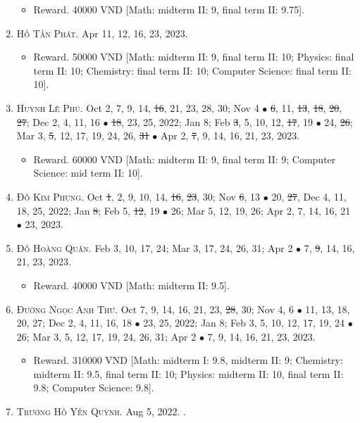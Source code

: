 \documentclass{article}
\begin{document}
\begin{enumerate}
	\begin{itemize}
		\item {\sf Reward.} 40000 VND [Math: midterm II: 9, final term II: 9.75].
	\end{itemize}
	\item \textsc{Hồ Tấn Phát.} {\sf[In]} Apr 11, 12, 16, 23, 2023.
	\begin{itemize}
		\item {\sf Reward.} 50000 VND [Math: midterm II: 9, final term II: 10; Physics: final term II: 10; Chemistry: final term II: 10; Computer Science: final term II: 10].
	\end{itemize}
	\item \textsc{Huỳnh Lê Phú.} {\sf[In]} Oct 2, 7, 9, 14, \st{16}, 21, 23, 28, 30; Nov 4 $\bullet$ \st{6}, 11, \st{13}, \st{18}, \st{20}, \st{27}; Dec 2, 4, 11, 16 $\bullet$ \st{18}, 23, 25, 2022; Jan 8; Feb \st{3}, 5, 10, 12, \st{17}, 19 $\bullet$ 24, \st{26}; Mar 3, \st{5}, 12, 17, 19, 24, 26, \st{31} $\bullet$ Apr 2, \st{7}, 9, 14, 16, 21, 23, 2023.
	\begin{itemize}
		\item {\sf Reward.} 60000 VND [Math: midterm II: 9, final term II: 9; Computer Science: mid term II: 10].
	\end{itemize}
	\item \textsc{Đỗ Kim Phụng.} {\sf[In]} Oct \st{1}, 2, 9, 10, 14, \st{16}, \st{23}, 30; Nov \st{6}, 13 $\bullet$ 20, \st{27}, Dec 4, 11, 18, 25, 2022; Jan \st{8}; Feb 5, \st{12}, 19 $\bullet$ 26; Mar 5, 12, 19, 26; Apr 2, 7, 14, 16, 21 $\bullet$ 23, 2023.
	\item \textsc{Đỗ Hoàng Quân.} {\sf[In]} Feb 3, 10, 17, 24; Mar 3, 17, 24, 26, 31; Apr 2 $\bullet$ 7, \st{9}, 14, 16, 21, 23, 2023.
	\begin{itemize}
		\item {\sf Reward.} 40000 VND [Math: midterm II: 9.5].
	\end{itemize}
	\item \textsc{Đường Ngọc Anh Thư.} {\sf[In]} Oct 7, 9, 14, 16, 21, 23, \st{28}, 30; Nov 4, 6 $\bullet$ 11, 13, 18, 20, 27; Dec 2, 4, 11, 16, 18 $\bullet$ 23, 25, 2022; Jan 8; Feb 3, 5, 10, 12, 17, 19, 24 $\bullet$ 26; Mar 3, 5, 12, 17, 19, 24, 26, 31; Apr 2 $\bullet$ 7, 9, 14, 16, 21, 23, 2023.
	\begin{itemize}
		\item {\sf Reward.} 310000 VND [Math: midterm I: 9.8, midterm II: 9; Chemistry: midterm II: 9.5, final term II: 10; Physics: midterm II: 10, final term II: 9.8; Computer Science: 9.8].
	\end{itemize}
	\item \textsc{Trương Hồ Yến Quỳnh.} {\sf[In]} Aug 5, 2022. {\sf[Out]}.
\end{enumerate}
\end{document}

